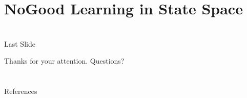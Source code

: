 \section[NoGoods]{NoGood Learning in State Space}
\subsection*{}

\begin{frame}{}

\end{frame}




\section*{}

\begin{frame}{Last Slide}

{\centering

Thanks for your attention. Questions?

}

\end{frame}

\section*{}

\begin{frame}[allowframebreaks]{References}
\footnotesize


\end{frame}






